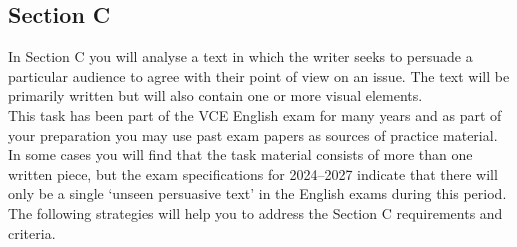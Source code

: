 \documentclass[a4paper]{article}
\begin{document}
\subsection{Section C}
In Section C you will analyse a text in which the writer seeks to persuade a particular audience to agree with their point of view on an issue. The text will be primarily written but will also contain one or more visual elements.\\

This task has been part of the VCE English exam for many years and as part of your preparation you may use past exam papers as sources of practice material. In some cases you will find that the task material consists of more than one written piece, but the exam specifications for 2024–2027 indicate that there will only be a single ‘unseen persuasive text’ in the English exams during this period.\\

The following strategies will help you to address the Section C requirements and criteria.\\
\end{document}
